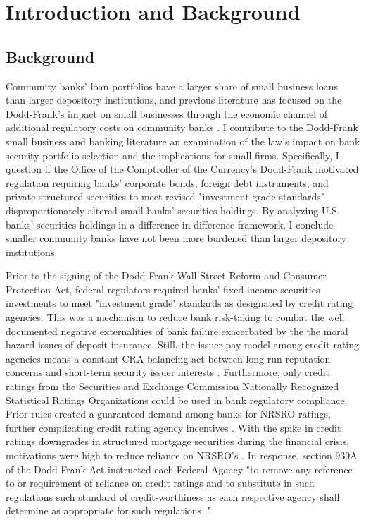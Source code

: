 \documentclass[preprint,12pt]{elsarticle}
\begin{document}


\section{Introduction and Background}
\subsection{Background}
Community banks' loan portfolios have a larger share of small business loans than larger depository institutions, and previous literature has focused on the Dodd-Frank's impact on small businesses through the economic channel of additional regulatory costs on community banks \citep{Dahl2016,LuxRobertGreene2015,Bordo2018,Reichow2017}.  I contribute to the Dodd-Frank small business and banking literature an examination of the law's impact on bank security portfolio selection and the implications for small firms. Specifically, I question if the Office of the Comptroller of the Currency's Dodd-Frank motivated regulation requiring banks' corporate bonds, foreign debt instruments, and private structured securities to meet revised "investment grade standards" disproportionately altered small banks' securities holdings.   By analyzing U.S. banks' securities holdings in a difference in difference framework, I conclude smaller community banks have not been more burdened than larger depository institutions.

Prior to the signing of the Dodd-Frank Wall Street Reform and Consumer Protection Act, federal regulators required banks' fixed income securities investments to meet "investment grade" standards as designated by credit rating agencies.  This was a mechanism to reduce bank risk-taking to combat the well documented negative externalities of bank failure exacerbated by the the moral hazard issues of deposit insurance.  Still, the issuer pay model among credit rating agencies means a constant CRA balancing act between long-run reputation concerns \citep{Klein1981} and short-term security issuer interests \citep{Becker2011,Goel2015}.  Furthermore, only credit ratings from the Securities and Exchange Commission Nationally Recognized Statistical Ratings Organizations could be used in bank regulatory compliance.  Prior rules created a guaranteed demand among banks for NRSRO ratings, further complicating credit rating agency incentives \citep{White2018}.  With the spike in credit ratings downgrades in structured mortgage securities during the financial crisis, motivations were high to reduce reliance on NRSRO's \citep{Soroushian2016}.  In response, section 939A of the Dodd Frank Act instructed each Federal Agency "to remove any reference to or requirement of reliance on credit ratings and to substitute in such regulations such standard of credit-worthiness as each respective agency shall determine as appropriate for such regulations \citep{111thCongress2010}." 
\end{document}
